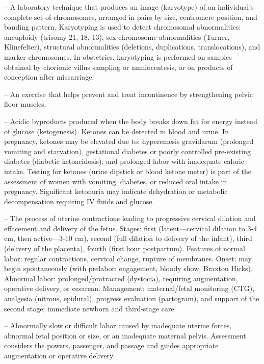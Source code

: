 -- A laboratory technique that produces an image (karyotype) of an individual's complete set of chromosomes, arranged in pairs by size, centromere position, and banding pattern. Karyotyping is used to detect chromosomal abnormalities: aneuploidy (trisomy 21, 18, 13), sex chromosome abnormalities (Turner, Klinefelter), structural abnormalities (deletions, duplications, translocations), and marker chromosomes. In obstetrics, karyotyping is performed on samples obtained by chorionic villus sampling or amniocentesis, or on products of conception after miscarriage.

-- An exercise that helps prevent and treat incontinence by strengthening pelvic floor muscles.

-- Acidic byproducts produced when the body breaks down fat for energy instead of glucose (ketogenesis). Ketones can be detected in blood and urine. In pregnancy, ketones may be elevated due to: hyperemesis gravidarum (prolonged vomiting and starvation), gestational diabetes or poorly controlled pre-existing diabetes (diabetic ketoacidosis), and prolonged labor with inadequate caloric intake. Testing for ketones (urine dipstick or blood ketone meter) is part of the assessment of women with vomiting, diabetes, or reduced oral intake in pregnancy. Significant ketonuria may indicate dehydration or metabolic decompensation requiring IV fluids and glucose.

-- The process of uterine contractions leading to progressive cervical dilation and effacement and delivery of the fetus. Stages: first (latent—cervical dilation to 3-4 cm, then active—3-10 cm), second (full dilation to delivery of the infant), third (delivery of the placenta), fourth (first hour postpartum). Features of normal labor: regular contractions, cervical change, rupture of membranes. Onset: may begin spontaneously (with prelabor: engagement, bloody show, Braxton Hicks). Abnormal labor: prolonged/protracted (dystocia), requiring augmentation, operative delivery, or cesarean. Management: maternal/fetal monitoring (CTG), analgesia (nitrous, epidural), progress evaluation (partogram), and support of the second stage; immediate newborn and third-stage care.

-- Abnormally slow or difficult labor caused by inadequate uterine forces, abnormal fetal position or size, or an inadequate maternal pelvis. Assessment considers the powers, passenger, and passage and guides appropriate augmentation or operative delivery.

